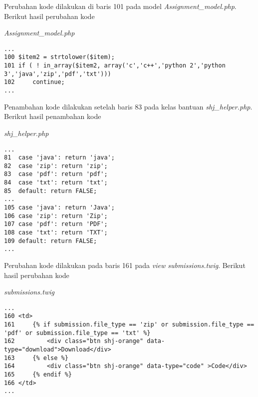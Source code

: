Perubahan kode dilakukan di baris 101 pada model \textit{Assignment\_model.php}. Berikut hasil perubahan kode 

\textit{Assignment\_model.php}
\begin{lstlisting}[basicstyle=\ttfamily, frame=single,
columns=fullflexible, keepspaces=true, breaklines=true]
...
100	$item2 = strtolower($item);
101	if ( ! in_array($item2, array('c','c++','python 2','python 3','java','zip','pdf','txt')))
102		continue;
...
\end{lstlisting}

Penambahan kode dilakukan setelah baris 83 pada kelas bantuan \textit{shj\_helper.php}. Berikut hasil penambahan kode 

\textit{shj\_helper.php}
\begin{lstlisting}[basicstyle=\ttfamily, frame=single,
columns=fullflexible, keepspaces=true, breaklines=true]
...
81	case 'java': return 'java';
82	case 'zip': return 'zip';
83	case 'pdf': return 'pdf';
84	case 'txt': return 'txt';
85	default: return FALSE;
...
105	case 'java': return 'Java';
106	case 'zip': return 'Zip';
107	case 'pdf': return 'PDF';
108	case 'txt': return 'TXT';
109	default: return FALSE;
...
\end{lstlisting}

Perubahan kode dilakukan pada baris 161 pada \textit{view submissions.twig}. Berikut hasil perubahan kode

\textit{submissions.twig}
\begin{lstlisting}[basicstyle=\ttfamily, frame=single,
columns=fullflexible, keepspaces=true, breaklines=true]
...
160	<td>
161		{% if submission.file_type == 'zip' or submission.file_type == 'pdf' or submission.file_type == 'txt' %}
162			<div class="btn shj-orange" data-type="download">Download</div>
163		{% else %}
164			<div class="btn shj-orange" data-type="code" >Code</div>
165		{% endif %}
166	</td>
...
\end{lstlisting}

